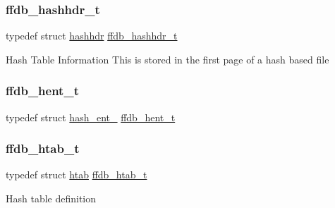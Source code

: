 \mbox{\label{adat-devel_2other__libs_2filedb_2filehash_2ffdb__hash_8h_aab0f28f6f6872895710d2edc192c8d3a}} 
\subsubsection{\texorpdfstring{ffdb\_hashhdr\_t}{ffdb\_hashhdr\_t}}
{\footnotesize\ttfamily typedef struct \mbox{\hyperlink{structhashhdr}{hashhdr}}  \mbox{\hyperlink{adat-devel_2other__libs_2filedb_2filehash_2ffdb__hash_8h_aab0f28f6f6872895710d2edc192c8d3a}{ffdb\+\_\+hashhdr\+\_\+t}}}

Hash Table Information This is stored in the first page of a hash based file \mbox{\label{adat-devel_2other__libs_2filedb_2filehash_2ffdb__hash_8h_aa1cea5ccbd6513ed152988f7a71a936d}} 
\subsubsection{\texorpdfstring{ffdb\_hent\_t}{ffdb\_hent\_t}}
{\footnotesize\ttfamily typedef struct \mbox{\hyperlink{structhash__ent__}{hash\+\_\+ent\+\_\+}}  \mbox{\hyperlink{adat-devel_2other__libs_2filedb_2filehash_2ffdb__hash_8h_aa1cea5ccbd6513ed152988f7a71a936d}{ffdb\+\_\+hent\+\_\+t}}}

\mbox{\label{adat-devel_2other__libs_2filedb_2filehash_2ffdb__hash_8h_ae592010ed2bedc975d3cc0b7d074b9d1}} 
\subsubsection{\texorpdfstring{ffdb\_htab\_t}{ffdb\_htab\_t}}
{\footnotesize\ttfamily typedef struct \mbox{\hyperlink{structhtab}{htab}}  \mbox{\hyperlink{adat-devel_2other__libs_2filedb_2filehash_2ffdb__hash_8h_ae592010ed2bedc975d3cc0b7d074b9d1}{ffdb\+\_\+htab\+\_\+t}}}

Hash table definition 

